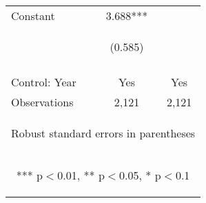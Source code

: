 \begin{center}
\begin{tabular}{lcc}
Constant & 3.688*** &  \\
 & \begin{footnotesize}(0.585)\end{footnotesize} & \begin{footnotesize}\end{footnotesize} \\
\vspace{4pt} & \begin{footnotesize}\end{footnotesize} & \begin{footnotesize}\end{footnotesize} \\
Control: Year & Yes & Yes \\ \hline
 Observations & 2,121 & 2,121 \\ \hline
\multicolumn{3}{c}{\begin{footnotesize} Robust standard errors in parentheses\end{footnotesize}} \\
\multicolumn{3}{c}{\begin{footnotesize} *** p$<$0.01, ** p$<$0.05, * p$<$0.1\end{footnotesize}} \\
\end{tabular}
\end{center}
